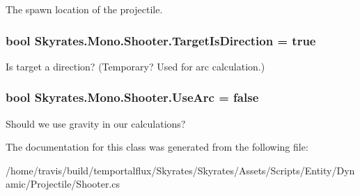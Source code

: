 The spawn location of the projectile. 

\hypertarget{class_skyrates_1_1_mono_1_1_shooter_a2e5d471386a013815f34d3f1e8bb8996}{
\subsubsection[{Target\-Is\-Direction}]{\setlength{\rightskip}{0pt plus 5cm}bool Skyrates.\-Mono.\-Shooter.\-Target\-Is\-Direction = true}}\label{class_skyrates_1_1_mono_1_1_shooter_a2e5d471386a013815f34d3f1e8bb8996}


Is target a direction? (Temporary? Used for arc calculation.) 

\hypertarget{class_skyrates_1_1_mono_1_1_shooter_a15bb2b7cdbb581dec901f16f930d0b8c}{
\subsubsection[{Use\-Arc}]{\setlength{\rightskip}{0pt plus 5cm}bool Skyrates.\-Mono.\-Shooter.\-Use\-Arc = false}}\label{class_skyrates_1_1_mono_1_1_shooter_a15bb2b7cdbb581dec901f16f930d0b8c}


Should we use gravity in our calculations? 



The documentation for this class was generated from the following file\-:\begin{DoxyCompactItemize}
\item 
/home/travis/build/temportalflux/\-Skyrates/\-Skyrates/\-Assets/\-Scripts/\-Entity/\-Dynamic/\-Projectile/Shooter.\-cs\end{DoxyCompactItemize}

